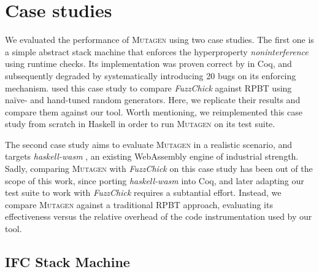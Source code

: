 \documentclass[sigconf, anonymous, review]{acmart}
\newcommand{\fuzzchick}{\textit{FuzzChick}\xspace}
\newcommand{\mutagen}{\textsc{Mutagen}\xspace}
\begin{document}




\section{Case studies}
\label{sec:casestudies}

We evaluated the performance of \mutagen using two case studies.
%
The first one is a simple abstract stack machine that enforces
the hyperproperty \emph{noninterference} \cite{goguen1982security} using runtime checks.
%
Its implementation was proven correct by \citeauthor{10.1145/2578855.2535839}
\citeyearpar{10.1145/2578855.2535839} in Coq, and subsequently degraded by
systematically introducing 20 bugs on its enforcing mechanism.
%
\citeauthor{lampropoulos2019coverage} used this case study to compare \fuzzchick
against RPBT using na\"ive- and hand-tuned random generators.
%
Here, we replicate their results and compare them against our tool.
%
Worth mentioning, we reimplemented this case study from scratch in Haskell in
order to run \mutagen on its test suite.


The second case study aims to evaluate \mutagen in a realistic scenario, and
targets \textit{haskell-wasm} \cite{haskellwasm}, an existing WebAssembly engine
of industrial strength.
%
%
Sadly, comparing \mutagen with \fuzzchick on this case study has been out of the
scope of this work, since porting \textit{haskell-wasm} into Coq, and later
adapting our test suite to work with \fuzzchick requires a subtantial effort.
%
Instead, we compare \mutagen against a traditional RPBT approach, evaluating its
effectiveness versus the relative overhead of the code instrumentation used by
our tool.




\subsection{IFC Stack Machine}
\end{document}
